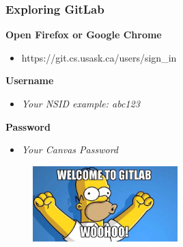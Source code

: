 \documentclass{beamer}
\begin{document}
\begin{frame}
	\frametitle{\textbf{Exploring GitLab}}

	\begin{multicols}{2}

	\textbf{Open Firefox or Google Chrome}
	\begin{itemize}
		\item https://git.cs.usask.ca/users/sign\_in
	\end{itemize}

	\vspace{0.5cm}	
	\textbf{Username}
	\begin{itemize}
		\item \textit{Your NSID example: abc123}
	\end{itemize}

	\vspace{0.2cm}
	\textbf{Password}
	\begin{itemize}
		\item \textit{Your Canvas Password}
	\end{itemize}

	\begin{figure}[h]
			\includegraphics[width=0.5\textwidth]{img/homer.png} 
	\end{figure}
\end{multicols}
\end{frame}
\end{document}
